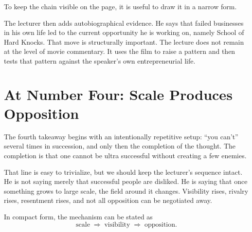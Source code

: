 To keep the chain visible on the page, it is useful to draw it in a narrow form.

\begin{figure}
\centering
{}
\end{figure}

The lecturer then adds autobiographical evidence. He says that failed businesses in his own life led to the current opportunity he is working on, namely School of Hard Knocks. That move is structurally important. The lecture does not remain at the level of movie commentary. It uses the film to raise a pattern and then tests that pattern against the speaker's own entrepreneurial life.

\section{At Number Four: Scale Produces Opposition}

The fourth takeaway begins with an intentionally repetitive setup: ``you can't'' several times in succession, and only then the completion of the thought. The completion is that one cannot be ultra successful without creating a few enemies.

That line is easy to trivialize, but we should keep the lecturer's sequence intact. He is not saying merely that successful people are disliked. He is saying that once something grows to large scale, the field around it changes. Visibility rises, rivalry rises, resentment rises, and not all opposition can be negotiated away.

In compact form, the mechanism can be stated as
\begin{equation}
\text{scale}
\;\Longrightarrow\;
\text{visibility}
\;\Longrightarrow\;
\text{opposition}.
\end{equation}

